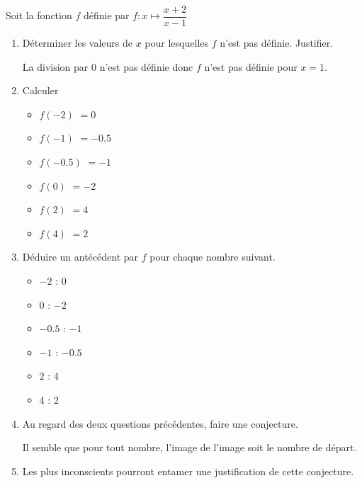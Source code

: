 \begin{corrige}
    Soit la fonction $f$ définie par $f:x\longmapsto\dfrac{x+2}{x-1}$

    \begin{changemargin}{0mm}{-10mm}
    \begin{enumerate}
        \item Déterminer les valeurs de $x$ pour lesquelles $f$ n'est pas définie. Justifier.
        
        {\red La division par $0$ n'est pas définie donc $f$ n'est pas définie pour $x=1$.}
        \item Calculer
            \begin{multicols}{3}
                \begin{itemize}
                    \item $f(-2)$ {\red $=0$ }
                    \item $f(-1)$ {\red $=\num{-0.5}$ }
                    \item $f(\num{-0.5})$ {\red $=-1$ }
                    \item $f(0)$ {\red $=-2$}
                    \item $f(2)$ {\red $=4$}
                    \item $f(4)$ {\red $=2$}
                \end{itemize}               
            \end{multicols}
        \item Déduire un antécédent par $f$ pour chaque nombre suivant.
            \begin{multicols}{3}
                \begin{itemize}
                    \item $-2$ {\red : $0$}
                    \item $0$ {\red : $-2$}
                    \item $\num{-0.5}$ {\red : $-1$}
                    \item $-1$ {\red : $\num{-0.5}$}                
                    \item $2$ {\red : $4$}
                    \item $4$ {\red : $2$}
                \end{itemize}               
            \end{multicols}
        \item Au regard des deux questions précédentes, faire une conjecture.
        
        {\red Il semble que pour tout nombre, l'image de l'image soit le nombre de départ.}
    \end{enumerate}
    \end{changemargin}
    \Coupe
    \begin{enumerate}
    \setcounter{enumi}{4}
        \item Les plus inconscients pourront entamer une justification de cette conjecture.
        

\end{enumerate}
\end{corrige}
